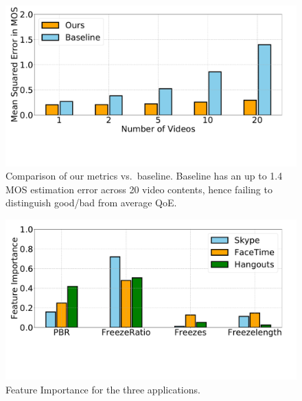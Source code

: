 \begin{figure}[t]
      \centering
      \includegraphics[width=\linewidth]{sections/network-work/baseline}
      \vspace{-3em}
      \caption{Comparison of our metrics vs.~baseline. Baseline has an up to 1.4 MOS estimation error across 20 video contents, hence failing to distinguish good/bad from average QoE. }
      \label{fig:baseline}
\end{figure}

\begin{figure}[t]
      \centering
      \includegraphics[width=\linewidth]{sections/network-work/feature-imp.pdf}
      \vspace{-4em}
      \caption{Feature Importance for the three applications.}
      \label{fig:ft-imp}
\end{figure}

